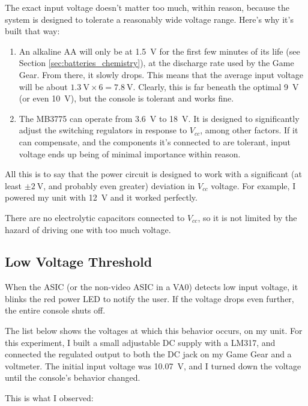 \documentclass{article}
\newcommand{\Vcc}{$V_{cc}$}
\newcommand{\model}{\textsf}
\begin{document}
The exact input voltage doesn't matter too much, within reason,
because the system is designed to tolerate a reasonably wide voltage
range. Here's why it's built that way:

\begin{enumerate}
\item An alkaline AA will only be at \qty{1.5}{\volt} for the first
  few minutes of its life (see Section \ref{sec:batteries_chemistry}),
  at the discharge rate used by the Game Gear. From there, it slowly
  drops. This means that the average input voltage will be about
  $\qty{1.3}{\volt} \times{} 6 = \qty{7.8}{\volt}$. Clearly, this is
  far beneath the optimal \qty{9}{\volt} (or even \qty{10}{\volt}),
  but the console is tolerant and works fine.
\item The \model{MB3775} can operate from \qty{3.6}{\volt} to
  \qty{18}{\volt}. It is designed to significantly adjust the
  switching regulators in response to \Vcc{}, among other factors. If
  it can compensate, and the components it's connected to are
  tolerant, input voltage ends up being of minimal importance within
  reason.
\end{enumerate}

All this is to say that the power circuit is designed to work with a
significant (at least $\pm{}\qty{2}{\volt}$, and probably even
greater) deviation in \Vcc{} voltage. For example, I powered my unit
with \qty{12}{\volt} and it worked perfectly.

There are no electrolytic capacitors connected to \Vcc{}, so it is not
limited by the hazard of driving one with too much voltage.

\subsection{Low Voltage Threshold}
\label{sec:low_voltage}
When the ASIC (or the non-video ASIC in a \model{VA0}) detects low
input voltage, it blinks the red power LED to notify the user. If the
voltage drops even further, the entire console shuts off.

The list below shows the voltages at which this behavior occurs, on my
unit. For this experiment, I built a small adjustable DC supply with a
\model{LM317}, and connected the regulated output to both the DC jack
on my Game Gear and a voltmeter. The initial input voltage was
\qty{10.07}{\volt}, and I turned down the voltage until the console's
behavior changed.

This is what I observed:
\end{document}
